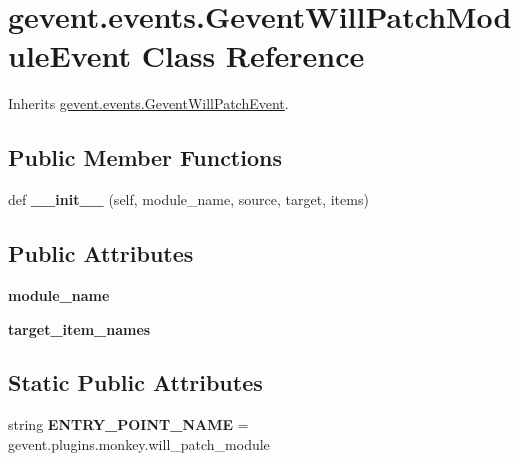 \hypertarget{classgevent_1_1events_1_1_gevent_will_patch_module_event}{}\section{gevent.\+events.\+Gevent\+Will\+Patch\+Module\+Event Class Reference}
\label{classgevent_1_1events_1_1_gevent_will_patch_module_event}


Inherits \hyperlink{classgevent_1_1events_1_1_gevent_will_patch_event}{gevent.\+events.\+Gevent\+Will\+Patch\+Event}.

\subsection*{Public Member Functions}
\begin{DoxyCompactItemize}
\item 
\mbox{\label{classgevent_1_1events_1_1_gevent_will_patch_module_event_ac0683f1f9db3c017a6c8310b23152ec8}} 
def {\bfseries \+\_\+\+\_\+init\+\_\+\+\_\+} (self, module\+\_\+name, source, target, items)
\end{DoxyCompactItemize}
\subsection*{Public Attributes}
\begin{DoxyCompactItemize}
\item 
\mbox{\label{classgevent_1_1events_1_1_gevent_will_patch_module_event_a26755f3712cfa90a344bbf9dabaf1262}} 
{\bfseries module\+\_\+name}
\item 
\mbox{\label{classgevent_1_1events_1_1_gevent_will_patch_module_event_a93f6d175607a4d7a68841c8b3e9addab}} 
{\bfseries target\+\_\+item\+\_\+names}
\end{DoxyCompactItemize}
\subsection*{Static Public Attributes}
\begin{DoxyCompactItemize}
\item 
\mbox{\label{classgevent_1_1events_1_1_gevent_will_patch_module_event_a21b170a530e6b5a38538ac16e41cc7e7}} 
string {\bfseries E\+N\+T\+R\+Y\+\_\+\+P\+O\+I\+N\+T\+\_\+\+N\+A\+ME} = \textquotesingle{}gevent.\+plugins.\+monkey.\+will\+\_\+patch\+\_\+module\textquotesingle{}
\end{DoxyCompactItemize}


